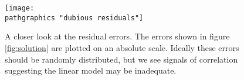 \begin{figure}[t]
	\texttt{[image: \\pathgraphics "dubious residuals"]}
	\caption{A closer look at the residual errors. The errors shown in figure \eqref{fig:solution} are plotted on an absolute scale. Ideally these errors should be randomly distributed, but we see signals of correlation suggesting the linear model may be inadequate.}
	\label{fig:dubious residuals}
\end{figure}

\endinput  %